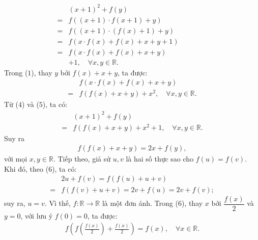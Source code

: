 \begin{multicols}{2}
	\begin{align*}
		&{\left( {x + 1} \right)^2} + f\left( y \right) \\
		= &f\left( {\left( {x + 1} \right) \cdot f\left( {x + 1} \right) + y} \right) \\
		= &f\left( {\left( {x + 1} \right) \cdot \left( {f\left( x \right) + 1} \right) + y} \right)\\
		=& f\left( {x \cdot f\left( x \right) + f\left( x \right) + x + y + 1} \right)\quad\quad\quad\quad\\
		=& f\left( {x \cdot f\left( x \right) + f\left( x \right) + x + y} \right)\\
		&+ 1, \quad\forall x, y \in \mathbb{R}.\tag{$4$}
	\end{align*}
	Trong ($1$), thay $y$ bởi $f(x) + x +y$,  ta được:
	\begin{align*}
		&f\left( {x \cdot f\left( x \right) + f\left( x \right) + x + y} \right)\\
		= &f\left( {f\left( x \right) + x + y} \right) + {x^2}, \quad\forall x,y \in \mathbb{R}. \tag{$5$}
	\end{align*}
	Từ ($4$) và ($5$), ta có:
	\begin{align*}
			&{\left( {x + 1} \right)^2} + f\left( y \right) \\
			= &f\left( {f\left( x \right) + x + y} \right) + {x^2} + 1, \quad \forall x,y \in \mathbb{R}.
	\end{align*}
	Suy ra
	\begin{align*}
		f\left( {f\left( x \right) + x + y} \right) = 2x + f\left( y \right), \tag{$6$}
	\end{align*}
	với mọi $x,y \in \mathbb{R}$.
	\vskip 0.05cm
	Tiếp theo, giả sử $u, v$ là hai số thực sao cho $f(u) = f(v)$. Khi đó, theo ($6$), ta có:
	\begin{align*}
		&2u + f\left( v \right) = f\left( {f\left( u \right) + u + v} \right) \\
		= &f\left( {f\left( v \right) \!+\! u \!+\! v} \right) \!=\! 2v +\! f\left( u \right) \!=\! 2v +\! f\left( v \right);
	\end{align*}
	suy ra, $u = v$. Vì thế, $f: \mathbb{R} \to \mathbb{R}$ là một đơn ánh.
	\vskip 0.05cm
	Trong ($6$), thay $x$ bởi $\dfrac{f(x)}{2}$  và $y = 0$, với lưu ý $f(0)=0$,  ta được:
	\begin{align*}
		f\left( {f\left( {\frac{{f\left( x \right)}}{2}} \right) + \frac{{f\left( x \right)}}{2}} \right) = f\left( x \right), \quad\forall x \in \mathbb{R}.
	\end{align*}

\end{multicols}

